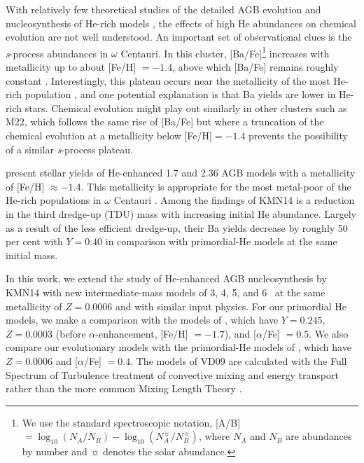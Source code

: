 With relatively few theoretical studies of the detailed AGB evolution and nucleosynthesis of He-rich models \citep{Campbell:2013bd,Charbonnel:2013jt,Karakas:2014jv,Karakas:2014ja}, the effects of high He abundances on chemical evolution are not well understood. An important set of observational clues is the \textit{s}-process abundances in $\omega$ Centauri. In this cluster, [Ba/Fe]\footnote{We use the standard spectroscopic notation, [A/B] $=\log_{10}(N_A/N_B) - \log_{10}(N_A^{\sun} / N_B^{\sun})$, where $N_A$ and $N_B$ are abundances by number and $\sun$ denotes the solar abundance.} increases with metallicity up to about [Fe/H] $=-1.4$, above which [Ba/Fe] remains roughly constant \citep{Norris:1995kc}. Interestingly, this plateau occurs near the metallicity of the most He-rich population \citep{Joo:2013dr}, and one potential explanation is that Ba yields are lower in He-rich stars. Chemical evolution might play out similarly in other clusters such as M22, which follows the same rise of [Ba/Fe] \citep{DaCosta:2011jh} but where a truncation of the chemical evolution at a metallicity below [Fe/H]$=-1.4$ prevents the possibility of a similar \textit{s}-process plateau.

\citet*[][hereafter KMN14]{Karakas:2014ja} present stellar yields of He-enhanced 1.7 and 2.36 \Msun AGB models with a metallicity of [Fe/H] $\approx-1.4$. This metallicity is appropriate for the most metal-poor of the He-rich populations in $\omega$ Centauri \citep{Joo:2013dr}. Among the findings of KMN14 is a reduction in the third dredge-up (TDU) mass with increasing initial He abundance. Largely as a result of the less efficient dredge-up, their Ba yields decrease by roughly 50 per cent with $Y=0.40$ in comparison with primordial-He models at the same initial mass.

In this work, we extend the study of He-enhanced AGB nucleosynthesis by KMN14 with new intermediate-mass models of 3, 4, 5, and 6 \Msun\ at the same metallicity of $Z=0.0006$ and with similar input physics. For our primordial He models, we make a comparison with the models of \citet*[][hereafter SCP14]{Straniero:2014jk}, which have $Y=0.245$, $Z=0.0003$ (before $\alpha$-enhancement, [Fe/H] $=-1.7$), and [$\alpha$/Fe] $=0.5$. We also compare our evolutionary models with the primordial-He models of \citet*[][hereafter VD09]{Ventura:2009ha}, which have $Z=0.0006$ and [$\alpha$/Fe] $=0.4$. The models of VD09 are calculated with the Full Spectrum of Turbulence \citep[FST;][]{Canuto:1991bj} treatment of convective mixing and energy transport rather than the more common Mixing Length Theory \citep[MLT;][]{Biermann:1948ul}.

